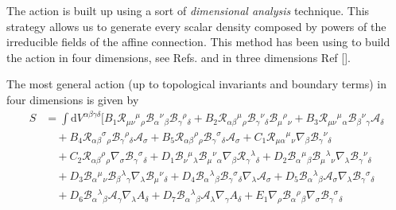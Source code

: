 \documentclass{article}
\begin{document}
The action is built up using a sort of \textit{dimensional analysis}
technique. This strategy allows us to generate every scalar density
composed by powers of the irreducible fields of the affine connection.
This method has been using to build the action in four dimensions, see
Refs. and in three dimensions Ref [].

The most general action (up to topological invariants and boundary terms) 
in four dimensions is given by
\begin{equation}
    \label{PAG_action}
    \begin{split}
    S
    & =
    \int  \mathrm{d}V^{\alpha \beta \gamma \delta} \bigg[
    B_1 \mathcal{R}_{\mu\nu}{}^{\mu}{}_{\rho}\mathcal{B}_{\alpha}{}^{\nu}{}_{\beta}\mathcal{B}_{\gamma}{}^{\rho}{}_{\delta}
    + B_2 \mathcal{R}_{\alpha\beta}{}^{\mu}{}_{\rho} \mathcal{B}_{\gamma}{}^{\nu}{}_{\delta} \mathcal{B}_{\mu}{}^{\rho}{}_{\nu}
    + B_3 \mathcal{R}_{\mu\nu}{}^{\mu}{}_{\alpha} \mathcal{B}_{\beta}{}^{\nu}{}_{\gamma} \mathcal{A}_\delta
    \\
    & \quad
    + B_4 \mathcal{R}_{\alpha\beta}{}^{\sigma}{}_{\rho}\mathcal{B}_{\gamma}{}^{\rho}{}_{\delta}\mathcal{A}_\sigma
    + B_5 \mathcal{R}_{\alpha \beta}{}^{\rho}{}_{\rho} \mathcal{B}_{\gamma}{}^{\sigma}{}_{\delta} \mathcal{A}_\sigma
    + C_1 \mathcal{R}_{\mu\alpha}{}^{\mu}{}_{\nu} \nabla_\beta \mathcal{B}_{\gamma}{}^{\nu}{}_{\delta}
    \\
    & \quad
    + C_2 \mathcal{R}_{\alpha\beta}{}^{\rho}{}_{\rho} \nabla_\sigma \mathcal{B}_{\gamma}{}^{\sigma}{}_{\delta}
    + D_1 \mathcal{B}_{\nu}{}^{\mu}{}_{\lambda} \mathcal{B}_{\mu}{}^{\nu}{}_{\alpha} \nabla_\beta \mathcal{R}_{\gamma}{}^{\lambda}{}_{\delta}
    + D_2 \mathcal{B}_{\alpha}{}^{\mu}{}_{\beta} \mathcal{B}_{\mu}{}^{\lambda}{}_{\nu} \nabla_{\lambda} \mathcal{B}_{\gamma}{}^{\nu}{}_{\delta}
    \\
    & \quad
    + D_3 \mathcal{B}_{\alpha}{}^{\mu}{}_{\nu}\mathcal{B}_{\beta}{}^{\lambda}{}_{\gamma} \nabla_\lambda \mathcal{B}_{\mu}{}^{\nu}{}_{\delta}
    + D_4 \mathcal{B}_{\alpha}{}^{\lambda}{}_{\beta}\mathcal{B}_{\gamma}{}^{\sigma}{}_{\delta}\nabla_\lambda \mathcal{A}_\sigma
    + D_5 \mathcal{B}_{\alpha}{}^{\lambda}{}_{\beta} \mathcal{A}_\sigma \nabla_\lambda \mathcal{B}_{\gamma}{}^{\sigma}{}_{\delta}
    \\
    &\quad
    + D_6 \mathcal{B}_{\alpha}{}^{\lambda}{}_{\beta}\mathcal{A}_\gamma \nabla_\lambda A_\delta
    + D_7\mathcal{B}_{\alpha}{}^{\lambda}{}_{\beta} \mathcal{A}_\lambda \nabla_\gamma A_\delta
    + E_1\nabla_\rho \mathcal{B}_{\alpha}{}^{\rho}{}_{\beta} \nabla_\sigma \mathcal{B}_{\gamma}{}^{\sigma}{}_{\delta}

\end{split}
\end{equation}
\end{document}
